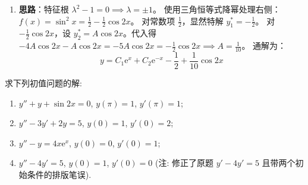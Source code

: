 \documentclass[lang=cn,11pt]{elegantbook}
\begin{document}
\begin{solution}
\begin{enumerate}
    \item[(8)] \textbf{思路}：特征根 $\lambda^2-1=0 \implies \lambda=\pm 1$。
    使用三角恒等式降幂处理右侧：$f(x) = \sin^2 x = \frac{1}{2} - \frac{1}{2}\cos 2x$。
    对常数项 $\frac{1}{2}$，显然特解 $y_1^* = -\frac{1}{2}$。
    对 $-\frac{1}{2}\cos 2x$，设 $y_2^* = A\cos 2x$。代入得 $-4A\cos 2x - A\cos 2x = -5A\cos 2x = -\frac{1}{2}\cos 2x \implies A = \frac{1}{10}$。
    通解为：
    \[
    y = C_1\mathrm{e}^x + C_2\mathrm{e}^{-x} - \frac{1}{2} + \frac{1}{10}\cos 2x
    \]
\end{enumerate}
\end{solution}


\begin{exercise}[非齐次方程初值问题]
求下列初值问题的解:
\begin{enumerate}
    \item[(1)] $y''+y+\sin 2x=0$, $y(\pi)=1$, $y'(\pi)=1$;
    \item[(2)] $y''-3y'+2y=5$, $y(0)=1$, $y'(0)=2$;
    \item[(3)] $y''-y=4x\mathrm{e}^x$, $y(0)=0$, $y'(0)=1$;
    \item[(4)] $y''-4y'=5$, $y(0)=1$, $y'(0)=0$ (注: 修正了原题 $y'-4y'=5$ 且带两个初始条件的排版笔误).
\end{enumerate}
\end{exercise}
\end{document}
